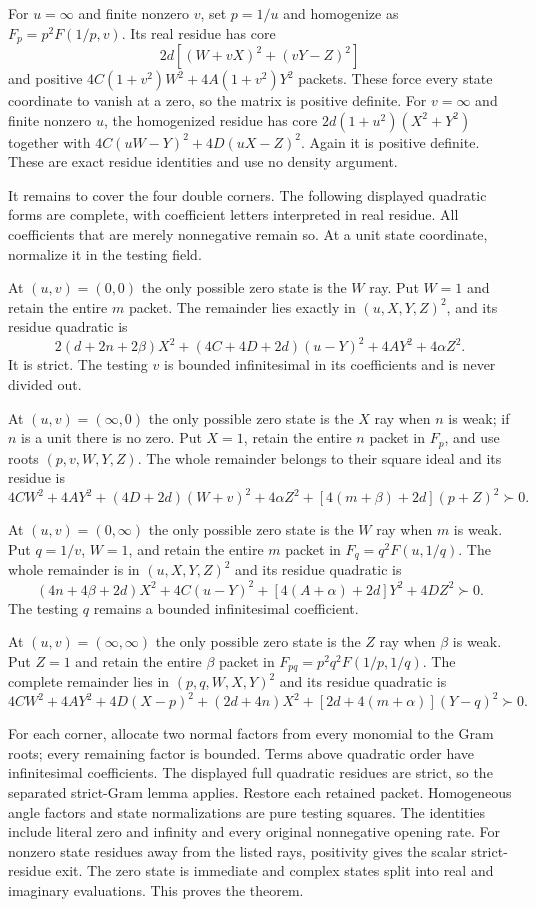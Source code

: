 For $u=\infty$ and finite nonzero $v$, set $p=1/u$ and homogenize
as $F_p=p^2F(1/p,v)$. Its real residue has core
\[
 2d[(W+vX)^2+(vY-Z)^2]
\]
and positive $4C(1+v^2)W^2+4A(1+v^2)Y^2$ packets. These
force every state coordinate to vanish at a zero, so the matrix is
positive definite. For $v=\infty$ and finite nonzero $u$, the
homogenized residue has core $2d(1+u^2)(X^2+Y^2)$ together with
$4C(uW-Y)^2+4D(uX-Z)^2$. Again it is positive definite.
These are exact residue identities and use no density argument.

It remains to cover the four double corners. The following displayed
quadratic forms are complete, with coefficient letters interpreted in
real residue. All coefficients that are merely nonnegative remain so.
At a unit state coordinate, normalize it in the testing field.

At $(u,v)=(0,0)$ the only possible zero state is the $W$ ray.
Put $W=1$ and retain the entire $m$ packet. The remainder lies
exactly in $(u,X,Y,Z)^2$, and its residue quadratic is
\[
 2(d+2n+2\beta)X^2+(4C+4D+2d)(u-Y)^2+4AY^2+4\alpha Z^2.
\]
It is strict. The testing $v$ is bounded infinitesimal in its
coefficients and is never divided out.

At $(u,v)=(\infty,0)$ the only possible zero state is the $X$ ray
when $n$ is weak; if $n$ is a unit there is no zero. Put $X=1$,
retain the entire $n$ packet in $F_p$, and use roots $(p,v,W,Y,Z)$.
The whole remainder belongs to their square ideal and its residue is
\[
 4CW^2+4AY^2+(4D+2d)(W+v)^2
                 +4\alpha Z^2+[4(m+\beta)+2d](p+Z)^2\succ0.
\]

At $(u,v)=(0,\infty)$ the only possible zero state is the $W$ ray
when $m$ is weak. Put $q=1/v$, $W=1$, and retain the entire $m$
packet in $F_q=q^2F(u,1/q)$. The whole remainder is in
$(u,X,Y,Z)^2$ and its residue quadratic is
\[
 (4n+4\beta+2d)X^2+4C(u-Y)^2+[4(A+\alpha)+2d]Y^2+4DZ^2\succ0.
\]
The testing $q$ remains a bounded infinitesimal coefficient.

At $(u,v)=(\infty,\infty)$ the only possible zero state is the $Z$
ray when $\beta$ is weak. Put $Z=1$ and retain the entire $\beta$
packet in $F_{pq}=p^2q^2F(1/p,1/q)$. The complete remainder lies
in $(p,q,W,X,Y)^2$ and its residue quadratic is
\[
 4CW^2+4AY^2+4D(X-p)^2+(2d+4n)X^2
                            +[2d+4(m+\alpha)](Y-q)^2\succ0.
\]

For each corner, allocate two normal factors from every monomial to
the Gram roots; every remaining factor is bounded. Terms above
quadratic order have infinitesimal coefficients. The displayed full
quadratic residues are strict, so the separated strict-Gram lemma
applies. Restore each retained packet. Homogeneous angle factors and
state normalizations are pure testing squares. The identities include
literal zero and infinity and every original nonnegative opening rate.
For nonzero state residues away from the listed rays, positivity gives
the scalar strict-residue exit. The zero state is immediate and complex
states split into real and imaginary evaluations. This proves the theorem.

